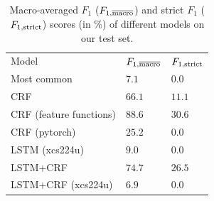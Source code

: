 \documentclass[11pt]{article}
\begin{document}

\begin{table}[t]
\centering
\caption{Macro-averaged $F_1$ ($F_{1, \overline{\rm{macro}}}$) and strict $F_1$ ($F_{1, \rm{strict}}$) scores (in \%) of different models on our test set.}
\label{scoresTab}
\begin{tabular}{|l|l|l|}
\hline
Model & $F_{1, \overline{\rm{macro}}}$ & $F_{1, \rm{strict}}$\\
\hhline{|=|=|=|}
Most common & $7.1$ & $0.0$\\
\hline
CRF & $66.1$ & $11.1$\\
\hline
CRF (feature functions) & $88.6$ & $30.6$\\
\hline
CRF (pytorch) & $25.2$ & $0.0$\\
\hline
LSTM (xcs224u) & $9.0$ & $0.0$\\
\hline
LSTM+CRF & $74.7$ & $26.5$\\
\hline
LSTM+CRF (xcs224u) & $6.9$ & $0.0$\\
\hline
\end{tabular}
\end{table}
\end{document}
